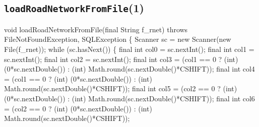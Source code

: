 \subsection{{\tt{}\protect{}loadRoadNetworkFromFile}(1)}
\nwenddocs{}\endmoddef{}
void loadRoadNetworkFromFile(final String f_rnet) throws FileNotFoundException, SQLException \{
  Scanner sc = new Scanner(new File(f_rnet));
  while (sc.hasNext()) \{
\eatline
{}\nwendcode{}
\nwenddocs{}\plusendmoddef
final int col0 = sc.nextInt();
final int col1 = sc.nextInt();
final int col2 = sc.nextInt();
final int col3 = (col1 == 0 ? (int) (0*sc.nextDouble()) : (int) Math.round(sc.nextDouble()*CSHIFT));
final int col4 = (col1 == 0 ? (int) (0*sc.nextDouble()) : (int) Math.round(sc.nextDouble()*CSHIFT));
final int col5 = (col2 == 0 ? (int) (0*sc.nextDouble()) : (int) Math.round(sc.nextDouble()*CSHIFT));
final int col6 = (col2 == 0 ? (int) (0*sc.nextDouble()) : (int) Math.round(sc.nextDouble()*CSHIFT));
\nwendcode{}

